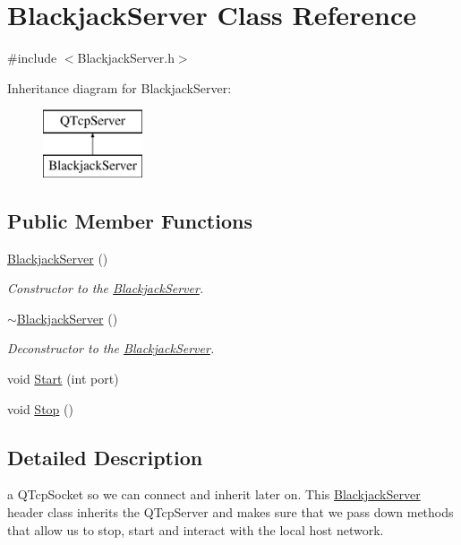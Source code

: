 \hypertarget{class_blackjack_server}{\section{Blackjack\-Server Class Reference}
\label{class_blackjack_server}
}


{\ttfamily \#include $<$Blackjack\-Server.\-h$>$}

Inheritance diagram for Blackjack\-Server\-:\begin{figure}[H]
\begin{center}
\leavevmode
\includegraphics[height=2.000000cm]{class_blackjack_server}
\end{center}
\end{figure}
\subsection*{Public Member Functions}
\begin{DoxyCompactItemize}
\item 
\hyperlink{class_blackjack_server_ab848d65f80f2a83e8964fafb620d1179}{Blackjack\-Server} ()
\begin{DoxyCompactList}\small\item\em Constructor to the \hyperlink{class_blackjack_server}{Blackjack\-Server}. \end{DoxyCompactList}\item 
\hyperlink{class_blackjack_server_a4275cccb6f0ffa373773cd34746028ca}{$\sim$\-Blackjack\-Server} ()
\begin{DoxyCompactList}\small\item\em Deconstructor to the \hyperlink{class_blackjack_server}{Blackjack\-Server}. \end{DoxyCompactList}\item 
void \hyperlink{class_blackjack_server_a46dfa380ee516b39f4d5f3d69fdd54d8}{Start} (int port)
\item 
void \hyperlink{class_blackjack_server_a5145b809514ca3f626f3b2840bca6814}{Stop} ()
\end{DoxyCompactItemize}


\subsection{Detailed Description}
a Q\-Tcp\-Socket so we can connect and inherit later on. This \hyperlink{class_blackjack_server}{Blackjack\-Server} header class inherits the Q\-Tcp\-Server and makes sure that we pass down methods that allow us to stop, start and interact with the local host network. 

